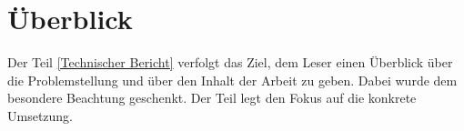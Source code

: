 
\section{Überblick}
\label{Überblick}

Der Teil \ref{Technischer Bericht}  verfolgt das Ziel, dem Leser einen Überblick über die Problemstellung und über den Inhalt der Arbeit zu geben. Dabei wurde dem  besondere Beachtung geschenkt. Der Teil  legt den Fokus auf die konkrete Umsetzung.

